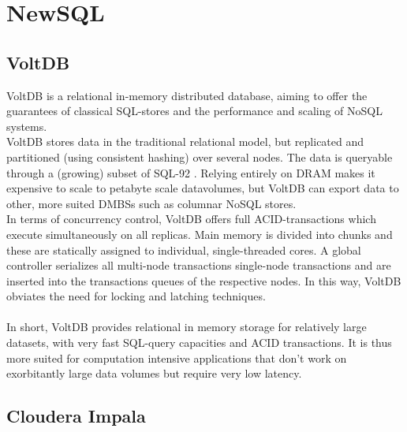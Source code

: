 \documentclass{IEEEtran}
\begin{document}
\section{NewSQL}
\subsection{VoltDB}

VoltDB is a relational in-memory distributed database, aiming to offer the guarantees of classical SQL-stores and the performance and scaling of NoSQL systems\cite{stonebraker2013voltdb}. %
\\VoltDB stores data in the traditional relational model, but replicated and partitioned (using consistent hashing) over several nodes\cite{grolinger2013data}. The data is queryable through a (growing) subset of SQL-92 \cite{voltdb2010voltdb}.
Relying entirely on DRAM makes it expensive to scale to petabyte scale datavolumes, but VoltDB can export data to other, more suited DMBSs such as columnar NoSQL stores.
\\In terms of concurrency control, VoltDB offers full ACID-transactions which execute simultaneously on all replicas. Main memory is divided into chunks and these are statically assigned to individual, single-threaded cores. A global controller serializes all multi-node transactions single-node transactions and are inserted into the transactions queues of the respective nodes. In this way, VoltDB obviates the need for locking and latching techniques.
\\\\
In short, VoltDB provides relational in memory storage for relatively large datasets, with very fast SQL-query capacities and ACID transactions. It is thus more suited for computation intensive applications that don't work on exorbitantly large data volumes but require very low latency.

\subsection{Cloudera Impala}
\end{document}
